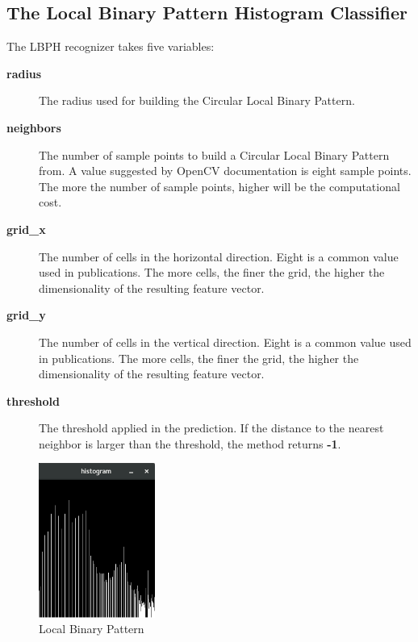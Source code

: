 \documentclass[conference]{IEEEtran}
\begin{document}
\subsection{The Local Binary Pattern Histogram Classifier}
The LBPH recognizer takes five variables: \\
\begin{description}
  \item[\textbf{radius}] \quad
  The radius used for building the Circular Local Binary Pattern.

  \item[\textbf{neighbors}] \quad
  The number of sample points to build a Circular Local Binary Pattern from.
  A value suggested by OpenCV documentation is eight sample points.
  The more the number of sample points, higher will be the computational cost.

  \item[\textbf{grid\_x}] \quad
  The number of cells in the horizontal direction.
  Eight is a common value used in publications.
  The more cells, the finer the grid, the higher the dimensionality of the
  resulting feature vector.

  \item[\textbf{grid\_y}] \quad
  The number of cells in the vertical direction.
  Eight is a common value used in publications.
  The more cells, the finer the grid, the higher the dimensionality of the
  resulting feature vector.

  \item[\textbf{threshold}] \quad
  The threshold applied in the prediction.
  If the distance to the nearest neighbor is larger than the threshold,
  the method returns \textbf{-1}.
\end{description}

\begin{figure}[!t]
\centering
\includegraphics[width=1.5in]{./histogram.png}
\caption{Local Binary Pattern}
\label{fig:lbph}
\end{figure}
\end{document}
